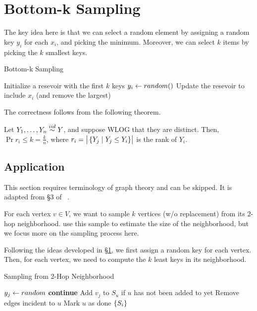 \documentclass{article}
\begin{document}
\section{Bottom-k Sampling}
\label{sec:bottomk}

The key idea here is that we can select a random element by assigning a random key $y_i$ for each $x_i$, and picking the minimum.
Moreover, we can select $k$ items by picking the $k$ smallest keys.

\begin{algorithm}
	\caption{Bottom-k Sampling}
	\begin{algorithmic}[1]
			\State Initialize a resevoir with the first $k$ keys
				\State $y_i \gets \mathop{random}()$
					\State Update the resevoir to include $x_i$ (and remove the largest)
				\EndIf
			\EndFor
		\EndFunction
	\end{algorithmic}
	\label{alg:bottomk}
\end{algorithm}

The correctness follows from the following theorem.
\begin{theorem}
	\label{thm:rank}
	Let $Y_1, \ldots, Y_n \overset{iid}{\sim} Y$, and suppose WLOG that they are distinct.
	Then, $\Pr{r_i \le k} = \frac{k}{n}$, where $r_i = \left| \bigr. \left\{ Y_j \mid Y_j \le Y_i \right\} \right|$ is the rank of $Y_i$.
\end{theorem}

\subsection{Application}
\label{sec:reach}

This section requires terminology of graph theory and can be skipped.
It is adapted from \S3 of ~\cite{cohen97-12}.

For each vertex $v \in V$, we want to sample $k$ vertices (w/o replacement) from its $2$-hop neighborhood.
\cite{cohen97-12} use this sample to estimate the size of the neighborhood, but we focus more on the sampling process here.

Following the ideas developed in \S\ref{sec:bottomk}, we first assign a random key for each vertex.
Then, for each vertex, we need to compute the $k$ least keys in its neighborhood.

\begin{algorithm}
	\caption{Sampling from 2-Hop Neighborhood}
	\begin{algorithmic}[1]
				\State $y_j \gets \mathop{random}$
						\State \textbf{continue}
					\EndIf
						\State Add $v_j$ to $S_u$ if $u$ has not been added to yet
						\State Remove edges incident to $u$
						\State Mark $u$ as done
					\EndFor
				\EndFor
			\EndFor
			\Return $\left\{ S_i \right\}$
		\EndFunction
	\end{algorithmic}
	\label{alg:sample2hop}
\end{algorithm}
\end{document}
